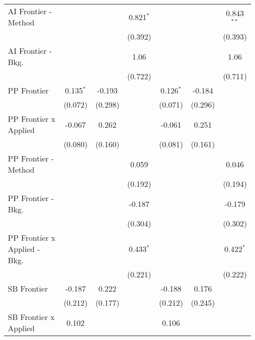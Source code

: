 \begin{tabular}{lcccccc}
   AI Frontier - Method         &             &             & 0.821$^{*}$ &              &             & 0.843$^{**}$\\   
                                &             &             & (0.392)     &              &             & (0.393)\\   
   AI Frontier - Bkg.           &             &             & 1.06        &              &             & 1.06\\   
                                &             &             & (0.722)     &              &             & (0.711)\\   
   PP Frontier                  & 0.135$^{*}$ & -0.193      &             & 0.126$^{*}$  & -0.184      &   \\   
                                & (0.072)     & (0.298)     &             & (0.071)      & (0.296)     &   \\   
   PP Frontier x Applied        & -0.067      & 0.262       &             & -0.061       & 0.251       &   \\   
                                & (0.080)     & (0.160)     &             & (0.081)      & (0.161)     &   \\   
   PP Frontier - Method         &             &             & 0.059       &              &             & 0.046\\   
                                &             &             & (0.192)     &              &             & (0.194)\\   
   PP Frontier - Bkg.           &             &             & -0.187      &              &             & -0.179\\   
                                &             &             & (0.304)     &              &             & (0.302)\\   
   PP Frontier x Applied - Bkg. &             &             & 0.433$^{*}$ &              &             & 0.422$^{*}$\\   
                                &             &             & (0.221)     &              &             & (0.222)\\   
   SB Frontier                  & -0.187      & 0.222       &             & -0.188       & 0.176       &   \\   
                                & (0.212)     & (0.177)     &             & (0.212)      & (0.245)     &   \\   
   SB Frontier x Applied        & 0.102       &             &             & 0.106        &             &   \\   

\end{tabular}
